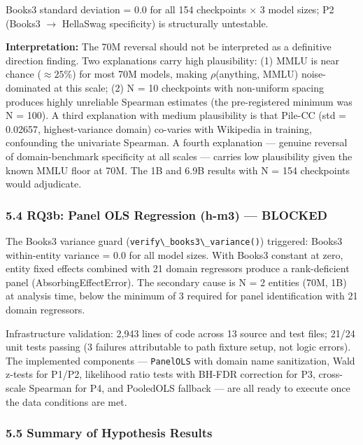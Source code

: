 Books3 standard deviation = 0.0 for all 154 checkpoints $\times$ 3 model sizes; P2 (Books3 $\rightarrow$ HellaSwag specificity) is structurally untestable.

\textbf{Interpretation:} The 70M reversal should not be interpreted as a definitive direction finding. Two explanations carry high plausibility: (1) MMLU is near chance ($\approx 25$\%) for most 70M models, making $\rho$(anything, MMLU) noise-dominated at this scale; (2) N = 10 checkpoints with non-uniform spacing produces highly unreliable Spearman estimates (the pre-registered minimum was N = 100). A third explanation with medium plausibility is that Pile-CC (std = 0.02657, highest-variance domain) co-varies with Wikipedia in training, confounding the univariate Spearman. A fourth explanation --- genuine reversal of domain-benchmark specificity at all scales --- carries low plausibility given the known MMLU floor at 70M. The 1B and 6.9B results with N = 154 checkpoints would adjudicate.

\subsubsection{5.4 RQ3b: Panel OLS Regression (h-m3) --- BLOCKED}

The Books3 variance guard (\texttt{verify\textbackslash \_books3\textbackslash \_variance()}) triggered: Books3 within-entity variance = 0.0 for all model sizes. With Books3 constant at zero, entity fixed effects combined with 21 domain regressors produce a rank-deficient panel (AbsorbingEffectError). The secondary cause is N = 2 entities (70M, 1B) at analysis time, below the minimum of 3 required for panel identification with 21 domain regressors.

Infrastructure validation: 2,943 lines of code across 13 source and test files; 21/24 unit tests passing (3 failures attributable to path fixture setup, not logic errors). The implemented components --- \texttt{PanelOLS} with domain name sanitization, Wald z-tests for P1/P2, likelihood ratio tests with BH-FDR correction for P3, cross-scale Spearman for P4, and PooledOLS fallback --- are all ready to execute once the data conditions are met.

\subsubsection{5.5 Summary of Hypothesis Results}

